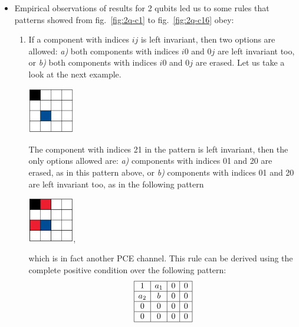 \documentclass[11pt,dvipsnames]{article} %
\newcommand{\fref}[1]{fig.~\ref{#1}}  \newcommand{\tref}[1]{table~\ref{#1}}
\newcommand{\1}{\mathds{1}}
\begin{document}
\begin{itemize}
\item Empirical observations of results for 2 qubits 
led us to some rules that 
patterns showed from \fref{fig:2q-c1} to \fref{fig:2q-c16} obey:
\begin{enumerate}
\item If a component with indices $ij$ is left invariant, then two options are
allowed: \textit{a)} both components with indices $i0$ and $0j$ are left
invariant too, or \textit{b)} both components with indices $i0$ and $0j$ are
erased.
Let us take a look at the next example. 
\begin{center}
\includegraphics[width=2cm]{img/ex-2q2c-empiricalRule}
\end{center}
The component with indices 21 in the pattern is left invariant,
then the only options allowed are: \textit{a)} components with indices 01 and
20 are erased, as in this pattern above, or \textit{b)} components 
with indices 01 and 20 are left invariant too, 
as in the following pattern 
\begin{center}
\includegraphics[width=2cm]{img/ex-2q4c-empiricalRule},
\end{center}
which is in fact another PCE channel. This rule can be derived using the complete positive condition over the following pattern:
\begin{equation}
\begin{array}{|c|c|c|c|}
\hline
1 & a_1 & 0 & 0 \\ 
\hline
a_2 & b & 0 & 0 \\ 
\hline
0 & 0 & 0 & 0 \\ 
\hline
0 & 0 & 0 & 0\\
\hline
\end{array}
\end{equation}


\end{enumerate}
\end{itemize}
\end{document}
